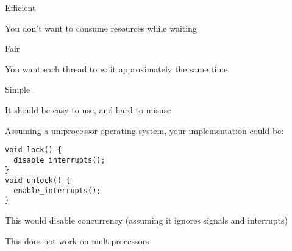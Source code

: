   \begin{slide}


    Efficient

    \leftspace{}You don't want to consume resources while waiting
    \medskip

    Fair

    \leftspace{}You want each thread to wait approximately the same time
    \medskip

    Simple

    \leftspace{}It should be easy to use, and hard to misuse

  \end{slide}

  \begin{slide}


    \centering

  \end{slide}

  \begin{slide}


    Assuming a uniprocessor operating system, your implementation could be:
    \medskip

    \begin{verbatim}
void lock() {
  disable_interrupts();
}
void unlock() {
  enable_interrupts();
}   
    \end{verbatim}
    \medskip

    This would disable concurrency (assuming it ignores signals and interrupts)

    \leftspace{}This does not work on multiprocessors

  \end{slide}

